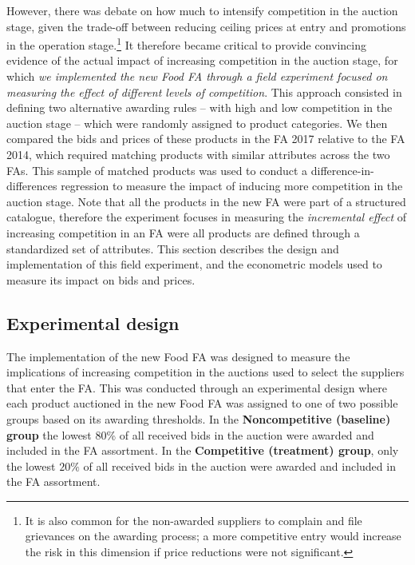 However, there was debate on how much to intensify competition in the auction stage, {given the trade-off between reducing ceiling prices at entry and promotions in the operation stage.}\footnote{It is also common for the non-awarded suppliers to complain and file grievances on the awarding process; a more competitive entry would increase the risk in this dimension if price reductions were not significant.} 
 It therefore became critical to provide convincing evidence of the actual impact of increasing competition in the auction stage, for which \textit{we implemented the new Food FA  through a field experiment focused on measuring the effect of different levels of competition}. This approach consisted in defining two alternative awarding rules -- with high and low competition in the auction stage -- which were randomly assigned to product categories. We then compared the bids and prices of these products in the FA 2017 relative to the FA 2014,  which required matching products with similar attributes across the two FAs. This sample of matched products was used to conduct a difference-in-differences regression to measure the impact of inducing more competition in the auction stage. Note that all the products in the new FA were part of a structured catalogue, therefore the experiment focuses in measuring the \textit{incremental effect} of increasing competition in an FA were all products are defined through a standardized set of attributes. This section describes the design and implementation of this field experiment, and the econometric models used to measure its impact on bids and prices.

\subsection{Experimental design}

The implementation of the new Food FA was designed to measure the implications of increasing  competition in the auctions used to select the suppliers that enter the FA. This was conducted through an experimental design where each product auctioned in the new Food FA was assigned to one of two possible groups based on its awarding thresholds. In the \textbf{Noncompetitive (baseline) group} the lowest 80\% of all received bids in the auction were awarded and included in the FA assortment. In the \textbf{Competitive (treatment) group}, only the lowest $20\%$ of all received bids in the auction were awarded and included in the FA assortment.

